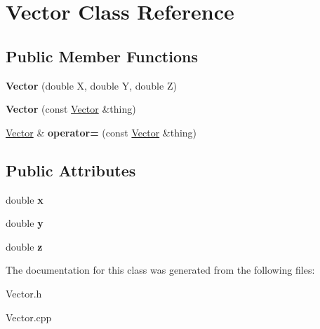 \hypertarget{class_vector}{}\section{Vector Class Reference}
\label{class_vector}
\subsection*{Public Member Functions}
\begin{DoxyCompactItemize}
\item 
\hypertarget{class_vector_a8a3ea7beb7d5c4ecbe92980a408dbe65}{}\label{class_vector_a8a3ea7beb7d5c4ecbe92980a408dbe65} 
{\bfseries Vector} (double X, double Y, double Z)
\item 
\hypertarget{class_vector_a3eada6cc519cbda30dc7addcd4b06854}{}\label{class_vector_a3eada6cc519cbda30dc7addcd4b06854} 
{\bfseries Vector} (const \hyperlink{class_vector}{Vector} \&thing)
\item 
\hypertarget{class_vector_a1f1f32870831166d91f196d6afc2174f}{}\label{class_vector_a1f1f32870831166d91f196d6afc2174f} 
\hyperlink{class_vector}{Vector} \& {\bfseries operator=} (const \hyperlink{class_vector}{Vector} \&thing)
\end{DoxyCompactItemize}
\subsection*{Public Attributes}
\begin{DoxyCompactItemize}
\item 
\hypertarget{class_vector_a133722e00601091cb2075219da5da6e4}{}\label{class_vector_a133722e00601091cb2075219da5da6e4} 
double {\bfseries x}
\item 
\hypertarget{class_vector_a09a21a140718f234eea348d5058cee0b}{}\label{class_vector_a09a21a140718f234eea348d5058cee0b} 
double {\bfseries y}
\item 
\hypertarget{class_vector_a1b604d674485316754b72494f5fcc960}{}\label{class_vector_a1b604d674485316754b72494f5fcc960} 
double {\bfseries z}
\end{DoxyCompactItemize}


The documentation for this class was generated from the following files\+:\begin{DoxyCompactItemize}
\item 
Vector.\+h\item 
Vector.\+cpp\end{DoxyCompactItemize}
